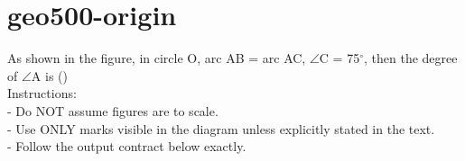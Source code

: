 \documentclass[12pt]{article}
\begin{document}
\section*{geo500-origin}
\noindent\begin{minipage}{\textwidth}
\setlength{\parskip}{4pt}
As shown in the figure, in circle O, arc AB = arc AC, \ensuremath{\angle }C = 75\ensuremath{^\circ}, then the degree of \ensuremath{\angle }A is ()\\
Instructions:\\
- Do NOT assume figures are to scale.\\
- Use ONLY marks visible in the diagram unless explicitly stated in the text.\\
- Follow the output contract below exactly.\\
\end{minipage}
\end{document}
